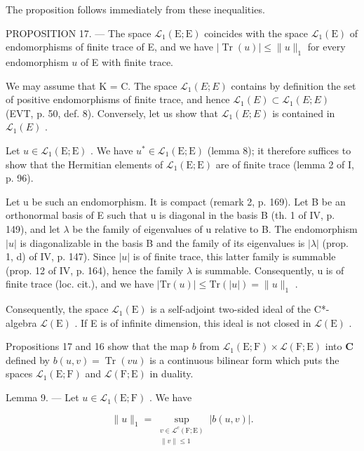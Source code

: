 The proposition follows immediately from these inequalities.

PROPOSITION 17. — The space \(\mathcal{L}_{1}(\mathrm{E};\mathrm{E})\) coincides with the space \(\mathcal{L}_{1}(\mathrm{E})\) of endomorphisms of finite trace of E, and we have \(|\operatorname{Tr}(u)|\leqslant \| u\|_{1}\) for every endomorphism \(u\) of E with finite trace.

We may assume that K = C. The space \(\mathcal{L}_{1}(E;E)\) contains by definition the set of positive endomorphisms of finite trace, and hence \(\mathcal{L}_{1}(E)\subset\mathcal{L}_{1}(E;E)\) (EVT, p. 50, def. 8). Conversely, let us show that \(\mathcal{L}_{1}(E;E)\) is contained in \(\mathcal{L}_{1}(E)\) .

Let \(u \in \mathcal{L}_{1}(\mathrm{E};\mathrm{E})\) . We have \(u^{*} \in \mathcal{L}_{1}(\mathrm{E};\mathrm{E})\) (lemma 8); it therefore suffices to show that the Hermitian elements of \(\mathcal{L}_{1}(\mathrm{E};\mathrm{E})\) are of finite trace (lemma 2 of I, p. 96).

Let u be such an endomorphism. It is compact (remark 2, p. 169). Let B be an orthonormal basis of E such that u is diagonal in the basis B (th. 1 of IV, p. 149), and let \(\lambda\) be the family of eigenvalues of u relative to B. The endomorphism \(|u|\) is diagonalizable in the basis B and the family of its eigenvalues is \(|\lambda|\) (prop. 1, d) of IV, p. 147). Since \(|u|\) is of finite trace, this latter family is summable (prop. 12 of IV, p. 164), hence the family \(\lambda\) is summable. Consequently, u is of finite trace (loc. cit.), and we have \(|\mathrm{Tr}(u)| \leqslant \mathrm{Tr}(|u|) = \|u\|_{1}\) .

Consequently, the space \(\mathcal{L}_{1}(\mathrm{E})\) is a self-adjoint two-sided ideal of the C*-algebra \(\mathcal{L}(\mathrm{E})\) . If E is of infinite dimension, this ideal is not closed in \(\mathcal{L}(\mathrm{E})\) .

Propositions 17 and 16 show that the map \(b\) from \(\mathcal{L}_1(\mathrm{E};\mathrm{F})\times \mathcal{L}(\mathrm{F};\mathrm{E})\) into \(\mathbf{C}\) defined by \(b(u,v) = \operatorname {Tr}(vu)\) is a continuous bilinear form which puts the spaces \(\mathcal{L}_1(\mathrm{E};\mathrm{F})\) and \(\mathcal{L}(\mathrm{F};\mathrm{E})\) in duality.

Lemma 9. --- Let \(u \in \mathcal{L}_1(\mathrm{E};\mathrm{F})\) . We have

\[
\| u\|_{1} = \sup_{\substack{v\in \mathcal{L}^{c}(\mathrm{F};\mathrm{E})\\ \| v\| \leqslant 1}}|b(u,v)|.
\]

